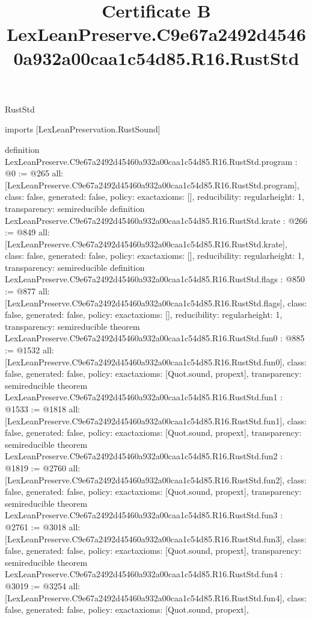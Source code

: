 \begin{lexlean}{RustStd}
\title{Certificate B LexLeanPreserve.C9e67a2492d45460a932a00caa1c54d85.R16.RustStd}
\begin{coremodule}
imports [LexLeanPreservation.RustSound]

definition LexLeanPreserve.C9e67a2492d45460a932a00caa1c54d85.R16.RustStd.program : @0 := @265 {
  all: [LexLeanPreserve.C9e67a2492d45460a932a00caa1c54d85.R16.RustStd.program],
  class: false,
  generated: false,
  policy: exact{axioms: []},
  reducibility: regular{height: 1},
  transparency: semireducible
}
definition LexLeanPreserve.C9e67a2492d45460a932a00caa1c54d85.R16.RustStd.krate : @266 := @849 {
  all: [LexLeanPreserve.C9e67a2492d45460a932a00caa1c54d85.R16.RustStd.krate],
  class: false,
  generated: false,
  policy: exact{axioms: []},
  reducibility: regular{height: 1},
  transparency: semireducible
}
definition LexLeanPreserve.C9e67a2492d45460a932a00caa1c54d85.R16.RustStd.flags : @850 := @877 {
  all: [LexLeanPreserve.C9e67a2492d45460a932a00caa1c54d85.R16.RustStd.flags],
  class: false,
  generated: false,
  policy: exact{axioms: []},
  reducibility: regular{height: 1},
  transparency: semireducible
}
theorem LexLeanPreserve.C9e67a2492d45460a932a00caa1c54d85.R16.RustStd.fun0 : @885 := @1532 {
  all: [LexLeanPreserve.C9e67a2492d45460a932a00caa1c54d85.R16.RustStd.fun0],
  class: false,
  generated: false,
  policy: exact{axioms: [Quot.sound, propext]},
  transparency: semireducible
}
theorem LexLeanPreserve.C9e67a2492d45460a932a00caa1c54d85.R16.RustStd.fun1 : @1533 := @1818 {
  all: [LexLeanPreserve.C9e67a2492d45460a932a00caa1c54d85.R16.RustStd.fun1],
  class: false,
  generated: false,
  policy: exact{axioms: [Quot.sound, propext]},
  transparency: semireducible
}
theorem LexLeanPreserve.C9e67a2492d45460a932a00caa1c54d85.R16.RustStd.fun2 : @1819 := @2760 {
  all: [LexLeanPreserve.C9e67a2492d45460a932a00caa1c54d85.R16.RustStd.fun2],
  class: false,
  generated: false,
  policy: exact{axioms: [Quot.sound, propext]},
  transparency: semireducible
}
theorem LexLeanPreserve.C9e67a2492d45460a932a00caa1c54d85.R16.RustStd.fun3 : @2761 := @3018 {
  all: [LexLeanPreserve.C9e67a2492d45460a932a00caa1c54d85.R16.RustStd.fun3],
  class: false,
  generated: false,
  policy: exact{axioms: [Quot.sound, propext]},
  transparency: semireducible
}
theorem LexLeanPreserve.C9e67a2492d45460a932a00caa1c54d85.R16.RustStd.fun4 : @3019 := @3254 {
  all: [LexLeanPreserve.C9e67a2492d45460a932a00caa1c54d85.R16.RustStd.fun4],
  class: false,
  generated: false,
  policy: exact{axioms: [Quot.sound, propext]},
}
\end{coremodule}
\end{lexlean}

